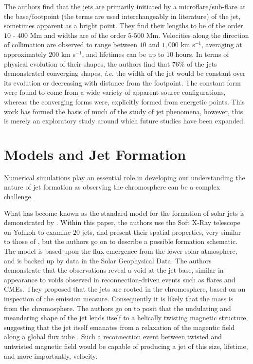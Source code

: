 The authors find that the jets are primarily initiated by a microflare/sub-flare at the base/footpoint (the terms are used interchangeably in literature) of the jet, sometimes apparent as a bright point.
They find their lengths to be of the order $10$ - $400$ Mm and widths are of the order $5$-$500$ Mm.
Velocities along the direction of collimation are observed to range between $10$ and $1,000$ km s$^{-1}$, averaging at approximately $200$ km s$^{-1}$, and lifetimes can be up to $10$ hours.
In terms of physical evolution of their shapes, the authors find that $76\%$ of the jets demonstrated converging shapes, \emph{i.e.} the width of the jet would be constant over its evolution or decreasing with distance from the footpoint. 
The constant form were found to come from a wide variety of apparent source configurations, whereas the converging forms were, explicitly formed from energetic points.
This work has formed the basis of much of the study of jet phenomena, however, this is merely an exploratory study around which future studies have been expanded.

\section{Models and Jet Formation}
\label{sec:models}
Numerical simulations play an essential role in developing our understanding the nature of jet formation as observing the chromosphere can be a complex challenge.

What has become known as the standard model for the formation of solar jets is demonstrated  by \cite{Shibata1992}.
Within this paper, the authors use the Soft X-Ray telescope on Yohkoh to examine $20$ jets, and present their spatial properties, very similar to those of \cite{Shimojo1996}, but the authors go on to describe a possible formation schematic.
The model is based upon the flux emergence from the lower solar atmosphere, and is backed up by data in the Solar Geophysical Data.
The authors demonstrate that the observations reveal a void at the jet base, similar in appearance to voids observed in reconnection-driven events such as flares and CMEs.
They proposed that the jets are rooted in the chromosphere, based on an inspection of the emission measure.
Consequently it is likely that the mass is from the chromosphere.
The authors go on to posit that the undulating and meandering shape of the jet lends itself to a helically twisting magnetic structure, suggesting that the jet itself emanates from a relaxation of the magentic field along a global flux tube \cite{Shibata1986}.
Such a reconnection event between twisted and untwisted magnetic field would be capable of producing a jet of this size, lifetime, and more importantly, velocity.

